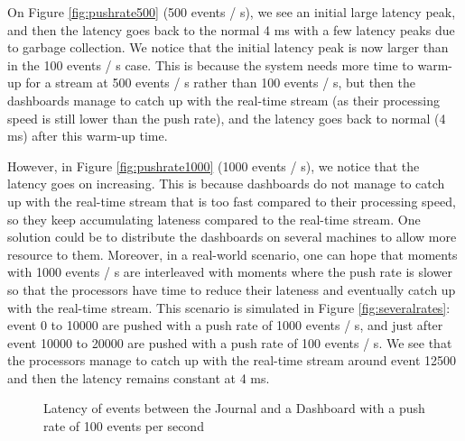 On Figure \ref{fig:pushrate500} (500 events / s), we see an initial large latency peak, and then the latency goes back to the normal 4 ms with a few latency peaks due to garbage collection. We notice that the initial latency peak is now larger than in the 100 events / s case. This is because the system needs more time to warm-up for a stream at 500 events / s rather than 100 events / s, but then the dashboards manage to catch up with the real-time stream (as their processing speed is still lower than the push rate), and the latency goes back to normal (4 ms) after this warm-up time.

However, in Figure \ref{fig:pushrate1000} (1000 events / s), we notice that the latency goes on increasing. This is because dashboards do not manage to catch up with the real-time stream that is too fast compared to their processing speed, so they keep accumulating lateness compared to the real-time stream. One solution could be to distribute the dashboards on several machines to allow more resource to them. Moreover, in a real-world scenario, one can hope that moments with 1000 events / s are interleaved with moments where the push rate is slower so that the processors have time to reduce their lateness and eventually catch up with the real-time stream. This scenario is simulated in Figure \ref{fig:severalrates}: event 0 to 10000 are pushed with a push rate of 1000 events / s, and just after event 10000 to 20000 are pushed with a push rate of 100 events / s. We see that the processors manage to catch up with the real-time stream around event 12500 and then the latency remains constant at 4 ms.
\\

\begin{figure}
  \begin{center} 
    \caption{Latency of events between the Journal and a Dashboard with a push rate of 100 events per second}
    \label{fig:pushrate100}
  \end{center}
\end{figure}

